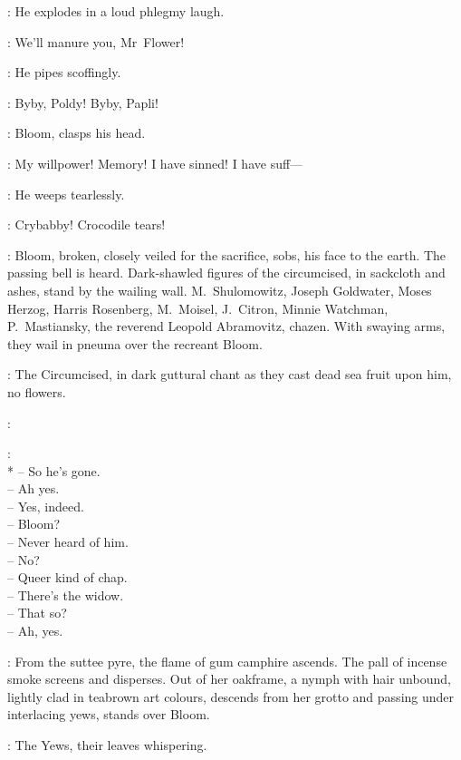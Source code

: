 :
He explodes in a loud phlegmy laugh.

\Bello:
We'll manure you, Mr~Flower!

:
He pipes scoffingly.

\Bello:
Byby, Poldy!
Byby, Papli!

:
Bloom, clasps his head.

\Bloom:
My willpower!
Memory!
I have sinned!
I have suff---

:
He weeps tearlessly.

\Bello:
Crybabby!
Crocodile tears!


:
Bloom, broken, closely veiled for the sacrifice, sobs, his face to the earth.
The passing bell is heard.
Dark-shawled figures of the circumcised,
in sackcloth and ashes, stand by the wailing wall.
M.~Shulomowitz, Joseph Goldwater, Moses Herzog, Harris Rosenberg,
M.~Moisel, J.~Citron, Minnie Watchman,
P.~Mastiansky, the reverend Leopold Abramovitz, chazen.
With swaying arms, they wail in pneuma over the recreant Bloom.

:
The Circumcised, in dark guttural chant as
they cast dead sea fruit upon him, no flowers.

\Circumcised:

\Voices:
\\*
-- So he's gone.\\
-- Ah yes.\\
-- Yes, indeed.\\
-- Bloom?\\
-- Never heard of him.\\
-- No?\\
-- Queer kind of chap.\\
-- There's the widow.\\
-- That so?\\
-- Ah, yes.

:
From the suttee pyre, the flame of gum camphire ascends.
The pall of incense smoke screens and disperses.
Out of her oakframe, a nymph with hair unbound,
lightly clad in teabrown art colours, descends from her grotto
and passing under interlacing yews, stands over Bloom.

:
The Yews, their leaves whispering.

